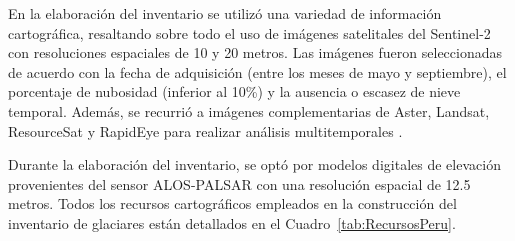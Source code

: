 En la elaboración del inventario se utilizó una variedad de información cartográfica, resaltando sobre todo el uso de imágenes satelitales del Sentinel-2 con resoluciones espaciales de 10 y 20 metros. Las imágenes fueron seleccionadas de acuerdo con la fecha de adquisición (entre los meses de mayo y septiembre), el porcentaje de nubosidad (inferior al 10\%) y la ausencia o escasez de nieve temporal. Además, se recurrió a imágenes complementarias de Aster, Landsat, ResourceSat y RapidEye para realizar análisis multitemporales \cite{inaigem2017manual}.

Durante la elaboración del inventario, se optó por modelos digitales de elevación provenientes del sensor ALOS-PALSAR con una resolución espacial de 12.5 metros. Todos los recursos cartográficos empleados en la construcción del inventario de glaciares están detallados en el Cuadro~\ref{tab:RecursosPeru}.

